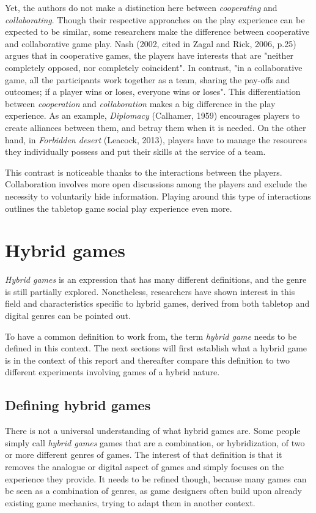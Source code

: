 Yet, the authors do not make a distinction here between \textit{cooperating} and \textit{collaborating}. Though their respective approaches on the play experience can be expected to be similar, some researchers make the difference between cooperative and collaborative game play. 
Nash (2002, cited in Zagal and Rick, 2006, p.25)\cite{art:collab} argues that in cooperative games, the players have interests that are "neither completely opposed, nor completely coincident". 
In contrast, "in a collaborative game, all the participants work together as a team, sharing the pay-offs and outcomes; if a player wins or loses, everyone wins or loses"\cite{art:collab}. 
This differentiation between \textit{cooperation} and \textit{collaboration} makes a big difference in the play experience. As an example, \textit{Diplomacy} (Calhamer, 1959)\cite{game:diplo} encourages players to create alliances between them, and betray them when it is needed. On the other hand, in \textit{Forbidden desert} (Leacock, 2013)\cite{game:desert}, players have to manage the resources they individually possess and put their skills at the service of a team. 

This contrast is noticeable thanks to the interactions between the players. Collaboration involves more open discussions among the players and exclude the necessity to voluntarily hide information. Playing around this type of interactions outlines the tabletop game social play experience even more.

\section{Hybrid games}
\textit{Hybrid games} is an expression that has many different definitions, and the genre is still partially explored. Nonetheless, researchers have shown interest in this field and characteristics specific to hybrid games, derived from both tabletop and digital genres can be pointed out.

To have a common definition to work from, the term \textit{hybrid game} needs to be defined in this context. The next sections will first establish what a hybrid game is in the context of this report and thereafter compare this definition to two different experiments involving games of a hybrid nature.

\subsection{Defining hybrid games}
There is not a universal understanding of what hybrid games are. Some people simply call \textit{hybrid games} games that are a combination, or hybridization, of two or more different genres of games. The interest of that definition is that it removes the analogue or digital aspect of games and simply focuses on the experience they provide. It needs to be refined though, because many games can be seen as a combination of genres, as game designers often build upon already existing game mechanics, trying to adapt them in another context. 

